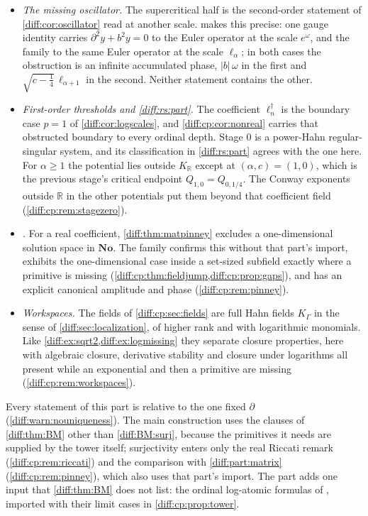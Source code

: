 \documentclass[11pt,letterpaper]{article}
\numberwithin{equation}{section}
\theoremstyle{definition}
\theoremstyle{remark}
\newcommand{\No}{\mathbf{No}}
\newcommand{\R}{\mathbb R}
\newcommand{\der}{\partial}
\newcommand{\abs}[1]{\lvert#1\rvert}
\newcommand{\KR}{K_{\R}}
\begin{document}
\begin{itemize}[leftmargin=1.6em]
\item \emph{The missing oscillator.} The supercritical half is the
second-order statement of \cref{diff:cor:oscillator} read at another scale.
 makes this precise: one gauge identity carries
$\der^{2}y+b^{2}y=0$ to the Euler operator at the scale $e^{\omega}$, and the
family to the same Euler operator at the scale
$\ell_{\alpha}$; in both cases the obstruction is an infinite accumulated
phase, $\abs b\,\omega$ in the first and $\sqrt{c-\frac14}\,\ell_{\alpha+1}$ in
the second. Neither statement contains the other.
\item \emph{First-order thresholds and \cref{diff:rs:part}.} The coefficient
$\ell_{n}^{\dagger}$ is the boundary case $p=1$ of \cref{diff:cor:logscales},
and \cref{diff:cp:cor:nonreal} carries that obstructed boundary to every
ordinal depth. Stage $0$ is a power-Hahn regular-singular system, and its
classification in \cref{diff:rs:part} agrees with the one here.
For $\alpha\geq1$ the potential lies outside $\KR$ except at
$(\alpha,c)=(1,0)$, which is the previous stage's critical endpoint
$Q_{1,0}=Q_{0,1/4}$. The Conway exponents outside $\R$ in the other
potentials put them beyond that coefficient field
(\cref{diff:cp:rem:stagezero}).
\item \emph{.} For a real coefficient,
\cref{diff:thm:matpinney} excludes a one-dimensional solution space in $\No$.
The family confirms this without that part's import, exhibits the
one-dimensional case inside a set-sized subfield exactly where a primitive is
missing (\cref{diff:cp:thm:fieldjump,diff:cp:prop:gaps}), and has an explicit
canonical amplitude and phase (\cref{diff:cp:rem:pinney}).
\item \emph{Workspaces.} The fields of \cref{diff:cp:sec:fields} are full Hahn
fields $K_{\Gamma}$ in the sense of \cref{diff:sec:localization}, of higher
rank and with logarithmic monomials. Like \cref{diff:ex:sqrt2,diff:ex:logmissing}
they separate closure properties, here with algebraic closure, derivative
stability and closure under logarithms all present while an exponential and
then a primitive are missing (\cref{diff:cp:rem:workspaces}).
\end{itemize}
Every statement of this part is relative to the one fixed $\der$
(\cref{diff:warn:nouniqueness}). The main construction uses the clauses of
\cref{diff:thm:BM} other than \ref{diff:BM:surj}, because the primitives it
needs are supplied by the tower itself; surjectivity enters only the real Riccati
remark (\cref{diff:cp:rem:riccati}) and the comparison with
\cref{diff:part:matrix} (\cref{diff:cp:rem:pinney}), which also uses that
part's import. The part adds one input that \cref{diff:thm:BM} does not list:
the ordinal log-atomic formulas of \cite{ADH}, imported with their limit cases
in \cref{diff:cp:prop:tower}.
\end{document}
